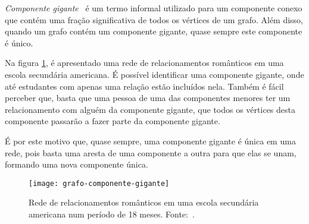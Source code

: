 \emph{Componente gigante}~\cite{easley2010networks} é um termo informal utilizado para 
um componente conexo que contém uma fração significativa de todos os vértices de um grafo. Além disso, quando um grafo contém um componente gigante, quase sempre este componente é único.

Na figura \ref{fig:grafo-componente-gigante}, é apresentado uma rede de relacionamentos românticos em uma escola secundária americana. É possível identificar uma componente gigante, onde até estudantes com apenas uma relação estão incluídos nela. Também é fácil perceber que, basta que uma pessoa de uma das componentes menores ter um relacionamento com alguém da componente gigante, que todos os vértices desta componente passarão a fazer parte da componente gigante. 

É por este motivo que, quase sempre, uma componente gigante é única em uma rede, pois basta uma aresta de uma componente a outra para que elas se unam, formando uma nova componente única.

\begin{figure}[H]
\texttt{[image: grafo-componente-gigante]}
\centering
\caption{
    Rede de relacionamentos românticos em uma escola secundária americana num período de 18 meses. Fonte:~\cite{bearman2004chains}.
}
\label{fig:grafo-componente-gigante}
\end{figure}






